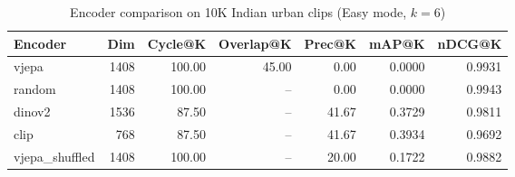 \begin{table}[ht]
\centering
\caption{Encoder comparison on 10K Indian urban clips (Easy mode, $k=6$)}
\label{tab:encoder_comparison}
\begin{tabular}{lrrrrrr}
\toprule
Encoder & Dim & Cycle@K & Overlap@K & Prec@K & mAP@K & nDCG@K \\
\midrule
vjepa & 1408 & 100.00 & 45.00 & 0.00 & 0.0000 & 0.9931 \\
random & 1408 & 100.00 & -- & 0.00 & 0.0000 & 0.9943 \\
dinov2 & 1536 & 87.50 & -- & 41.67 & 0.3729 & 0.9811 \\
clip & 768 & 87.50 & -- & 41.67 & 0.3934 & 0.9692 \\
vjepa\_shuffled & 1408 & 100.00 & -- & 20.00 & 0.1722 & 0.9882 \\
\bottomrule
\end{tabular}
\end{table}